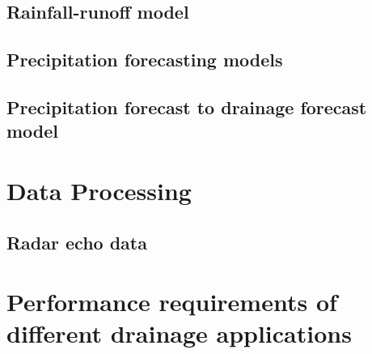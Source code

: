 \subsection{Rainfall-runoff model}
\subsection{Precipitation forecasting models}

\subsection{Precipitation forecast to drainage forecast model}







\section{Data Processing}
\subsection{Radar echo data}



\section{Performance requirements of different drainage applications}
